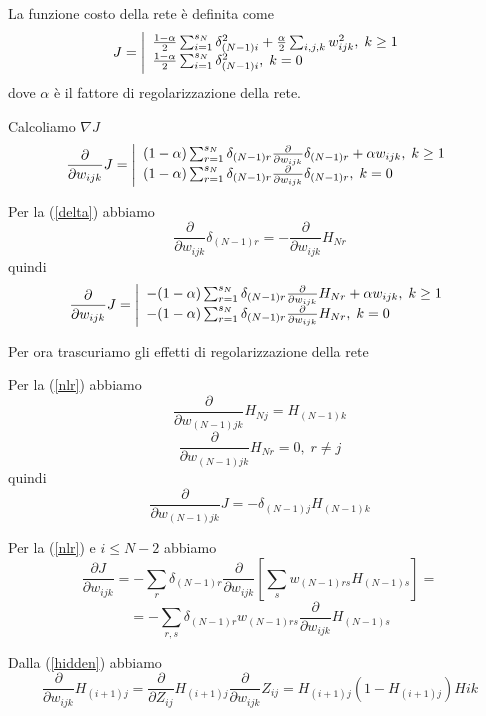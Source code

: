 \documentclass[a4paper,11pt]{article}
\begin{document}
La funzione costo della rete è definita come
\[
  J=\left|
    \begin{array}l
      \frac{1 - \alpha}{2} \sum_{i=1}^{s_N} \delta_{(N-1)i}^2 + \frac{\alpha}{2}\sum_{i,j,k} w_{ijk}^2, \; k \ge 1
      \\
      \frac{1 - \alpha}{2} \sum_{i=1}^{s_N} \delta_{(N-1)i}^2,\; k=0
    \end{array}
  \right.
\]
dove $ \alpha $ è il fattore di regolarizzazione della rete.

Calcoliamo $ \nabla J $
\[
	\frac{\partial}{\partial w_{ijk}} J = \left|
    \begin{array}l
		(1 - \alpha) \sum_{r=1}^{s_N} \delta_{(N-1)r} \frac{\partial}{\partial w_{ijk}}  \delta_{(N-1)r} + \alpha w_{ijk}, \; k \ge 1
	      \\
		(1 - \alpha)\sum_{r=1}^{s_N} \delta_{(N-1)r} \frac{\partial }{\partial w_{ijk}}\delta_{(N-1)r}, \; k =0
    \end{array}
  \right.
\]

Per la (\ref{delta}) abbiamo
\[
	\frac{\partial}{\partial w_{ijk}} \delta_{(N-1)r} = 
	-\frac{\partial}{\partial w_{ijk}} H_{Nr}
\]
quindi
\[
	\frac{\partial}{\partial w_{ijk}} J =\left|
    \begin{array}l
		-(1 - \alpha) \sum_{r=1}^{s_N} \delta_{(N-1)r} \frac{\partial}{\partial w_{ijk}} H_{Nr} + \alpha w_{ijk}, \; k \ge 1
	      \\
		-(1 - \alpha)\sum_{r=1}^{s_N} \delta_{(N-1)r} \frac{\partial}{\partial w_{ijk}} H_{Nr}, \; k =0
    \end{array}
  \right.
\]

Per ora trascuriamo gli effetti di regolarizzazione della rete

Per la (\ref{nlr}) abbiamo
\[
	\frac{\partial}{\partial w_{(N-1)jk}}  H_{Nj} = H_{(N-1)k}
\]
\[
	\frac{\partial}{\partial w_{(N-1)jk}}  H_{Nr} = 0, \; r \ne j
\]
quindi
\[
	\frac{\partial}{\partial w_{(N-1)jk}} J =
		- \delta_{(N-1)j} H_{(N-1)k}
\]

Per la (\ref{nlr}) e $ i \le N - 2  $ abbiamo
\[
	\frac{\partial J}{\partial w_{ijk}} =
	 - \sum_r \delta_{(N-1)r} \frac{\partial}{\partial w_{ijk}} \left[ \sum_s w_{(N-1)rs} H_{(N-1)s} \right] =
\]
\[
	= - \sum_{r,s} \delta_{(N-1)r} w_{(N-1)rs} \frac{\partial}{\partial w_{ijk}} H_{(N-1)s}
\]

Dalla (\ref{hidden}) abbiamo
\[
	\frac{\partial}{\partial w_{ijk}} H_{(i+1)j} =
	\frac{\partial}{\partial Z_{ij}} H_{(i+1)j} 
	\frac{\partial}{\partial w_{ijk}} Z_{ij} =
	H_{(i+1)j} (1 - H_{(i+1)j}) Hik
\]
\end{document}

